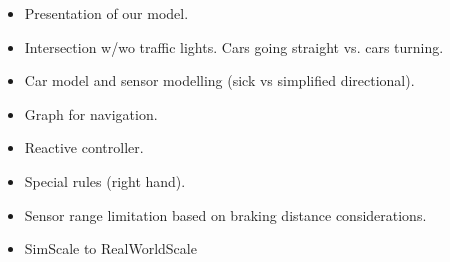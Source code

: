 \begin{itemize}
\item Presentation of our model.
\item Intersection w/wo traffic lights. Cars going straight vs. cars turning.
\item Car model and sensor modelling (sick vs simplified directional).
\item Graph for navigation.
\item Reactive controller.
\item Special rules (right hand).
\item Sensor range limitation based on braking distance considerations.
\item SimScale to RealWorldScale
\end{itemize}
